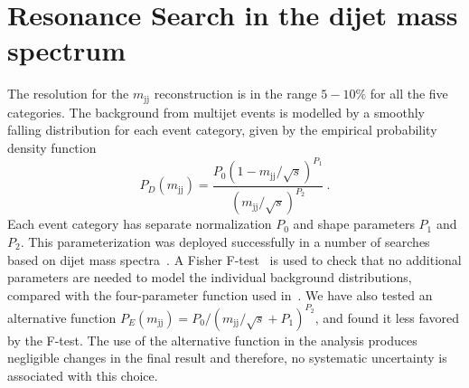 \section{Resonance Search in the dijet mass spectrum}
\label{sec:background}



The resolution for the $m_\mathrm{jj}$ reconstruction is 
in the range $5 - 10\% $ for all the five categories.
The background from multijet events is modelled by a smoothly falling
distribution for each event category, given by the empirical
probability density function
\begin{equation}
P_D(m_\mathrm{jj}) = \frac{P_{0} (1 - m_\mathrm{jj}/\sqrt{s})^{P_{1}}}{(m_\mathrm{jj}/\sqrt{s})^{P_{2}}} \ .
\label{eqParam}
\end{equation}
\noindent 
Each event category has separate normalization $P_0$ and shape parameters $P_1$
and $P_2$.
This
parameterization was deployed successfully in a number of 
searches based on dijet mass
spectra~\cite{cmsdijet}. A Fisher F-test~\cite{Ftest} is used to check
that no additional parameters are needed to model the individual
background distributions, compared with the four-parameter function used in~\cite{cmsdijet}.
We have also tested an alternative function $P_E(m_\mathrm{jj}) = P_{0}/{(m_\mathrm{jj}/\sqrt{s} + P_{1})}^{P_{2}}$,
and found it less favored by the F-test.
The use of the alternative function in 
the analysis produces negligible changes
in the final result and therefore, no systematic 
uncertainty is associated with
this choice.

